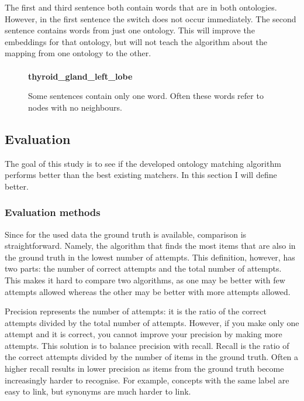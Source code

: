 \documentclass{article}
\begin{document}
 The first and third sentence both contain words that are in both ontologies. However, in the first sentence the switch does not occur immediately. The second sentence contains words from just one ontology. This will improve the embeddings for that ontology, but will not teach the algorithm about the mapping from one ontology to the other.
 
 \begin{figure}[H]
 \paragraph{}
 \textbf{thyroid\_gland\_left\_lobe}
 \label{singlesentence}
 \caption[Sentence with single word]{Some sentences contain only one word. Often these words refer to nodes with no neighbours.}
 \end{figure}
 \newpage
 \subsection{Evaluation}
 The goal of this study is to see if the developed ontology matching algorithm performs better than the best existing matchers. In this section I will define better.
 \subsubsection{Evaluation methods} \label{EvaluationMethods}
 Since for the used data the ground truth is available, comparison is straightforward. Namely, the algorithm that finds the most items that are also in the ground truth in the lowest number of attempts. This definition, however, has two parts: the number of correct attempts and the total number of attempts. This makes it hard to compare two algorithms, as one may be better with few attempts allowed whereas the other may be better with more attempts allowed.
 
 Precision represents the number of attempts: it is the ratio of the correct attempts divided by the total number of attempts. However, if you make only one attempt and it is correct, you cannot improve your precision by making more attempts. This solution is to balance precision with recall. Recall is the ratio of the correct attempts divided by the number of items in the ground truth. Often a higher recall results in lower precision as items from the ground truth become increasingly harder to recognise. For example, concepts with the same label are easy to link, but synonyms are much harder to link. 
 
\end{document}
